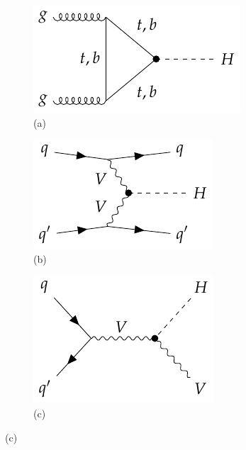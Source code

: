 
\begin{figure}[!ht]
    \captionsetup[subfigure]{labelformat=empty}
    \vspace*{-0.2cm}
    \centering
    \setlength{\mylength}{\textwidth}
    \begin{subfigure}[t]{0.33\mylength}
            \centering
            \includegraphics[height=0.17\mylength]{resources/H_production_diagrams/v1.pdf}
            \setlength{\unitlength}{0.25\mylength}
            \caption{\footnotesize (a)}
    \end{subfigure}%
    \begin{subfigure}[t]{0.33\mylength}
            \centering
            \includegraphics[height=0.17\mylength]{resources/H_production_diagrams/v2.pdf}
            \setlength{\unitlength}{0.25\mylength}
            \caption{\footnotesize (b)}
    \end{subfigure}%
    \begin{subfigure}[t]{0.33\mylength}
            \centering
            \includegraphics[height=0.20\mylength]{resources/H_production_diagrams/v3.pdf}
            \setlength{\unitlength}{0.25\mylength}
            \caption{\footnotesize (c)}

\end{subfigure}
\end{figure}
